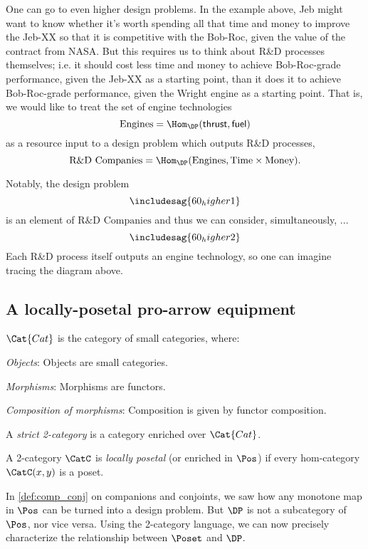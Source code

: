 One can go to even higher design problems. In the example above, Jeb might want to know whether it's worth spending all that time and money to improve the Jeb-XX so that it is competitive with the Bob-Roc, given the value of the contract from NASA. But this requires us to think about R\&D processes themselves; i.e. it should cost less time and money to achieve Bob-Roc-grade performance, given the Jeb-XX as a starting point, than it does it to achieve Bob-Roc-grade performance, given the Wright engine as a starting point. That is, we would like to treat the set of engine technologies
\[\text{Engines} = \Hom_\DP(\mathsf{thrust}, \mathsf{fuel})\]
as a resource input to a design problem which outputs R\&D processes,
\[\text{R\&D Companies} = \Hom_\DP(\text{Engines}, \text{Time} \times \text{Money}).\]

Notably, the design problem
\[
\includesag{60_higher1}
\]
is an element of $\text{R\&D Companies}$ and thus we can consider, simultaneously, ...
\[
\includesag{60_higher2}
\]
Each R\&D process itself outputs an engine technology, so one can imagine tracing the diagram above.

\subsection{A locally-posetal pro-arrow equipment}
\begin{definition}
$\Cat{Cat}$ is the category of small categories, where:
\begin{compactenum}
    \item \emph{Objects}: Objects are small categories.
    \item \emph{Morphisms}: Morphisms are functors.
    \item \emph{Composition of morphisms}: Composition is given by functor composition.
\end{compactenum}
\end{definition}

\begin{definition}[2-category]
A \emph{strict 2-category} is a category enriched over $\Cat{Cat}$.
\end{definition}

\begin{definition}
\label{def:locallyposetalcat}
A 2-category $\CatC$ is \emph{locally posetal} (or enriched in $\Pos$) if every hom-category $\CatC(x,y)$ is a poset.
\end{definition}
In \cref{def:comp_conj} on companions and conjoints, we saw how any monotone map in $\Pos$ can be turned into a design problem. But $\DP$ is not a subcategory of $\Pos$, nor vice versa. Using the 2-category language, we can now precisely characterize the relationship between $\Poset$ and $\DP$. %


